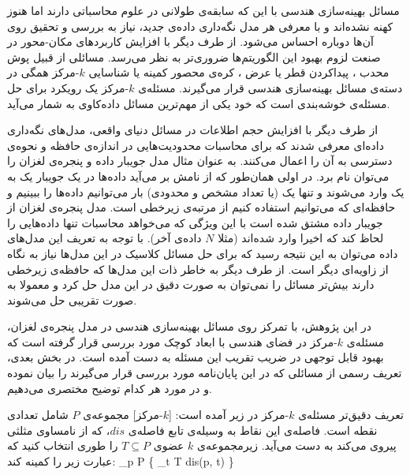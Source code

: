 


مسائل بهینه‌سازی هندسی  با این که سابقه‌ی طولانی در علوم محاسباتی دارند اما هنوز کهنه نشده‌اند و با معرفی هر مدل نگه‌داری داده‌ی جدید، نیاز به بررسی و تحقیق روی آن‌ها دوباره احساس می‌شود. از طرف دیگر با افزایش کاربردهای مکان-محور  در صنعت لزوم بهبود این الگوریتم‌ها ضروری‌تر به نظر می‌رسد. مسائلی از قبیل پوش محدب ، پیداکردن قطر  یا عرض ، کره‌ی محصور کمینه  یا شناسایی $k$-مرکز   همگی در دسته‌ی مسائل بهینه‌سازی هندسی قرار می‌گیرند. مسئله‌ی $k$-مرکز یک رویکرد برای حل مسئله‌ی خوشه‌بندی است که خود یکی از مهم‌ترین مسائل داده‌کاوی  به شمار می‌آید. 

از طرف دیگر با افزایش حجم اطلاعات در مسائل دنیای واقعی، مدل‌های نگه‌داری داده‌ای معرفی شدند که برای محاسبات محدودیت‌هایی در اندازه‌ی حافظه و نحوه‌ی دسترسی به آن را اعمال می‌کنند. به عنوان مثال مدل جویبار داده  و پنجره‌ی لغزان   را می‌توان نام برد. در اولی همان‌طور که از نامش بر می‌آید داده‌ها در یک جویبار یک به یک وارد می‌شوند و تنها یک (یا تعداد مشخص و محدودی) بار می‌توانیم داده‌ها را ببینیم و حافظه‌ای که می‌توانیم استفاده کنیم از مرتبه‌ی زیرخطی  است. مدل پنجره‌ی لغزان از جویبار داده مشتق شده است با این ویژگی که می‌خواهد محاسبات تنها داده‌هایی  را لحاظ کند که اخیرا وارد شده‌اند (مثلا $N$ داده‌ی آخر). با توجه به تعریف این مدل‌های داده می‌توان به این نتیجه رسید که برای حل مسائل کلاسیک در این مدل‌ها نیاز به نگاه از زاویه‌ای دیگر است. از طرف دیگر به خاطر ذات این مدل‌ها که حافظه‌ی زیرخطی دارند بیش‌تر مسائل را نمی‌توان به صورت دقیق در این مدل حل کرد و معمولا به صورت تقریبی حل می‌شوند.

در این پژوهش، با تمرکز روی مسائل بهینه‌سازی هندسی در مدل پنجره‌ی لغزان، مسئله‌ی $k$-مرکز در فضای هندسی با ابعاد کوچک مورد بررسی قرار گرفته است که بهبود قابل توجهی در ضریب تقریب این مسئله به دست آمده است.
در بخش بعدی، تعریف رسمی از مسائلی که در این پایان‌نامه مورد بررسی قرار می‌گیرند را بیان نموده و در مورد هر کدام توضیح مختصری می‌دهیم.


تعریف دقیق‌تر مسئله‌ی $k$-مرکز در زیر آمده است:
[$k$-مرکز]
مجموعه‌ی $P$ شامل تعدادی نقطه است. فاصله‌ی این نقاط به وسیله‌ی تابع فاصله‌ی $dis$، که از نامساوی مثلثی پیروی می‌کند به دست می‌آید.
زیرمجموعه‌ی $k$ عضوی $T \subseteq P$ را طوری انتخاب کنید که عبارت زیر را کمینه کند:
\max_{p \in P} \{ \min_{t \in T} dis(p, t) \}

